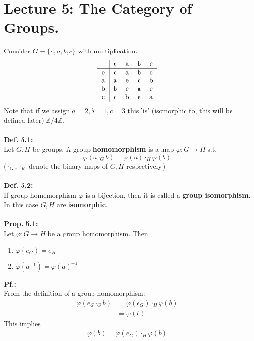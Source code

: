 \documentclass{article}
\begin{document}
\section{Lecture 5: The Category of Groups.}
Consider $G=\lbrace e,a,b,c\rbrace$ with multiplication.
\begin{equation}
\begin{tabular}{c|cccc}
~&e&a&b&c\\
\hline
e&e&a&b&c\\
a&a&e&c&b\\
b&b&c&a&e\\
c&c&b&e&a\\
\end{tabular}
\end{equation}
Note that if we assign $a=2,b=1,c=3$ this 'is' (isomorphic to, this will be defined later) $\mathbb{Z}/4\mathbb{Z}$.\\
\vspace{2mm}~\\
\textbf{Def. 5.1:}\\
Let $G,H$ be groups. A group \textbf{homomorphism} is a map $\varphi:G\rightarrow H$ s.t.
\begin{equation}
\varphi(a\cdot_Gb)=\varphi (a)\cdot_H\varphi(b)
\end{equation}
($\cdot_G,\cdot_H$ denote the binary maps of $G,H$ respectively.)\\
\vspace{2mm}~\\
\textbf{Def. 5.2:}\\
If group homomorphism $\varphi$ is a bijection, then it is called a \textbf{group isomorphism}. In this case $G,H$ are \textbf{isomorphic}.\\
\vspace{2mm}~\\
\textbf{Prop. 5.1:}\\
Let $\varphi:G\rightarrow H$ be a group homomorphism. Then
\begin{enumerate}
\item $\varphi(e_G)=e_H$
\item $\varphi(a^{-1})=\varphi(a)^{-1}$ 
\end{enumerate}
\textbf{Pf.:}\\
From the definition of a group homomorphism:
\begin{align*}
\varphi(e_G\cdot_Gb)&=\varphi(e_G)\cdot_H\varphi(b)\\
&=\varphi(b)
\end{align*}
This implies
\begin{align*}
\varphi(b)=\varphi(e_G)\cdot_H\varphi(b)
\end{align*}
\end{document}
